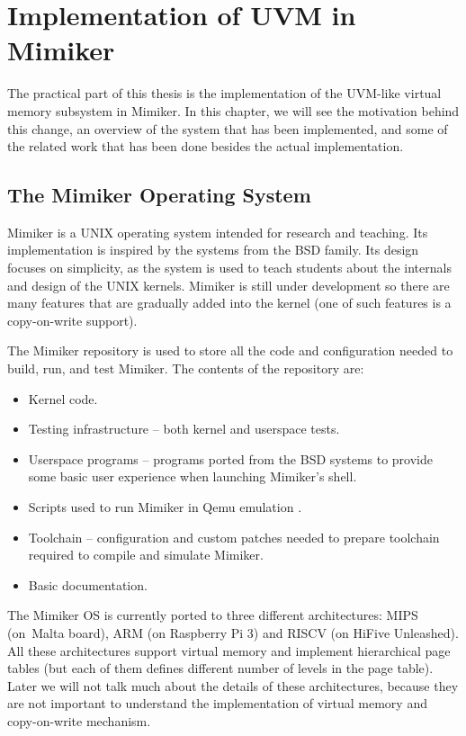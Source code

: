 \chapter{Implementation of UVM in Mimiker}
\label{chapter:mimiker}

The practical part of this thesis is the implementation of the UVM-like virtual memory subsystem in Mimiker.
In this chapter, we will see the motivation behind this change, an overview of the system that has been implemented,
and some of the related work that has been done besides the actual implementation.

\section{The Mimiker Operating System}

Mimiker \cite{mimiker:website} is a UNIX operating system intended for research and teaching.
Its implementation is inspired by the systems from the BSD family.
Its design focuses on simplicity, as the system is used to teach students about the internals and design of the UNIX kernels.
Mimiker is still under development so there are many features that are gradually added into the kernel (one of such features is a copy-on-write support).

The Mimiker repository \cite{mimiker:sources} is used to store all the code and configuration needed to build, run, and test Mimiker.
The contents of the repository are:
\begin{itemize}
  \item Kernel code.
  \item Testing infrastructure -- both kernel and userspace tests.
  \item Userspace programs -- programs ported from the BSD systems to provide some basic user experience when launching Mimiker's shell.
  \item Scripts used to run Mimiker in Qemu emulation \cite{qemu:website}.
  \item Toolchain -- configuration and custom patches needed to prepare toolchain required to compile and simulate Mimiker.
  \item Basic documentation.
\end{itemize}

The Mimiker OS is currently ported to three different architectures: MIPS (on~Malta board), ARM (on Raspberry Pi 3) and RISCV (on HiFive Unleashed).
All these architectures support virtual memory and implement hierarchical page tables (but each of them defines different number of levels in the page table).
Later we will not talk much about the details of these architectures,
because they are not important to understand the implementation of virtual memory and copy-on-write mechanism.

